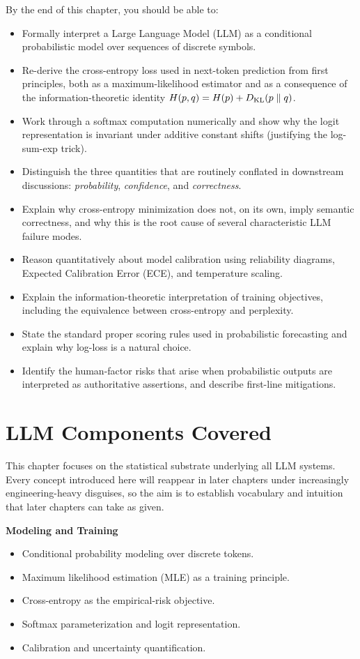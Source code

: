By the end of this chapter, you should be able to:
\begin{itemize}
  \item Formally interpret a Large Language Model (LLM) as a conditional probabilistic model over sequences of discrete symbols.
  \item Re-derive the cross-entropy loss used in next-token prediction from first principles, both as a maximum-likelihood estimator and as a consequence of the information-theoretic identity $H(p,q) = H(p) + D_{\mathrm{KL}}(p \parallel q)$.
  \item Work through a softmax computation numerically and show why the logit representation is invariant under additive constant shifts (justifying the log-sum-exp trick).
  \item Distinguish the three quantities that are routinely conflated in downstream discussions: \emph{probability}, \emph{confidence}, and \emph{correctness}.
  \item Explain why cross-entropy minimization does not, on its own, imply semantic correctness, and why this is the root cause of several characteristic LLM failure modes.
  \item Reason quantitatively about model calibration using reliability diagrams, Expected Calibration Error (ECE), and temperature scaling.
  \item Explain the information-theoretic interpretation of training objectives, including the equivalence between cross-entropy and perplexity.
  \item State the standard proper scoring rules used in probabilistic forecasting and explain why log-loss is a natural choice.
  \item Identify the human-factor risks that arise when probabilistic outputs are interpreted as authoritative assertions, and describe first-line mitigations.
\end{itemize}

\section{LLM Components Covered}

This chapter focuses on the statistical substrate underlying all LLM systems. Every concept introduced here will reappear in later chapters under increasingly engineering-heavy disguises, so the aim is to establish vocabulary and intuition that later chapters can take as given.

\textbf{Modeling and Training}
\begin{itemize}
  \item Conditional probability modeling over discrete tokens.
  \item Maximum likelihood estimation (MLE) as a training principle.
  \item Cross-entropy as the empirical-risk objective.
  \item Softmax parameterization and logit representation.
  \item Calibration and uncertainty quantification.
\end{itemize}


